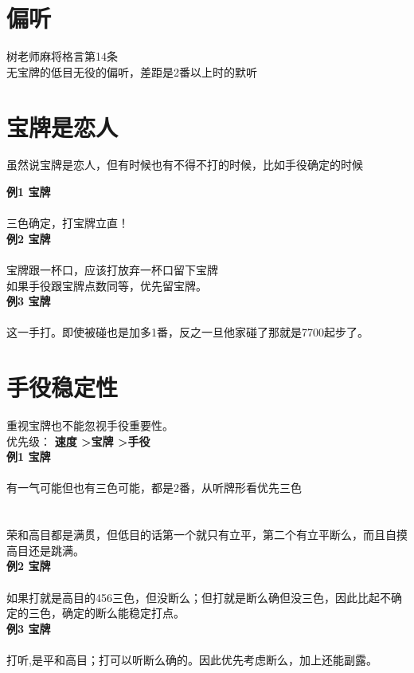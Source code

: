 \documentclass[小V的日麻笔记.tex]{subfiles}
\begin{document}
\section{偏听}
树老师麻将格言第14条
\\
无宝牌的低目无役的偏听，差距是2番以上时的默听

\section{宝牌是恋人}
虽然说宝牌是恋人，但有时候也有不得不打的时候，比如手役确定的时候

\textbf{例1 宝牌}
\\
\\
三色确定，打宝牌立直！
\\
\hrulefill
\textbf{例2 宝牌}
\\
\\
宝牌跟一杯口，应该打放弃一杯口留下宝牌
\\
如果手役跟宝牌点数同等，优先留宝牌。
\\
\hrulefill
\textbf{例3 宝牌}
\\
\\
这一手打。即使被碰也是加多1番，反之一旦他家碰了那就是7700起步了。

\section{手役稳定性}
重视宝牌也不能忽视手役重要性。
\\
优先级： \textbf{速度 \textgreater 宝牌 \textgreater 手役}
\\
\textbf{例1 宝牌}
\\
\\
有一气可能但也有三色可能，都是2番，从听牌形看优先三色
\\
\\
\\
荣和高目都是满贯，但低目的话第一个就只有立平，第二个有立平断么，而且自摸高目还是跳满。
\\
\hrulefill
\textbf{例2 宝牌}
\\
\\
如果打就是高目的456三色，但没断么；但打就是断么确但没三色，因此比起不确定的三色，确定的断么能稳定打点。
\\
\hrulefill
\textbf{例3 宝牌}
\\
\\
打听,是平和高目；打可以听断么确的。因此优先考虑断么，加上还能副露。
\end{document}
